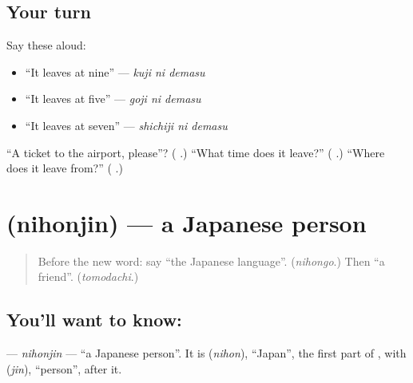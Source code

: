 \subsection*{Your turn}
Say these aloud:

\begin{itemize}
\raggedright
  \item \textquotedblleft{}It leaves at nine\textquotedblright{} — \emph{kuji ni demasu}
  \item \textquotedblleft{}It leaves at five\textquotedblright{} — \emph{goji ni demasu}
  \item \textquotedblleft{}It leaves at seven\textquotedblright{} — \emph{shichiji ni demasu}
\end{itemize}

\begin{tcolorbox}[breakable,colback=teal!4,colframe=teal!35!black,title={Before you move on}]
\textquotedblleft{}A ticket to the airport, please\textquotedblright{}? (\textbf{  }.) \textquotedblleft{}What time does it leave?\textquotedblright{} (\textbf{ }.) \textquotedblleft{}Where does it leave from?\textquotedblright{} (\textbf{ }.)
\end{tcolorbox}
\section[\texorpdfstring{\ja{日本人} (nihonjin)}{日本人 (nihonjin)}]{ (nihonjin) — a Japanese person}

\label{lesson:JA-C256-nihonjin}



\begin{quote}
Before the new word: say \textquotedblleft{}the Japanese language\textquotedblright{}. (\emph{nihongo}.) Then \textquotedblleft{}a friend\textquotedblright{}. (\emph{tomodachi}.)
\end{quote}

\subsection*{You'll want to know: }
\textbf{} — \emph{nihonjin} — \textquotedblleft{}a Japanese person\textquotedblright{}. It is \textbf{} (\emph{nihon}), \textquotedblleft{}Japan\textquotedblright{}, the first part of \textbf{}, with \textbf{} (\emph{jin}), \textquotedblleft{}person\textquotedblright{}, after it.

